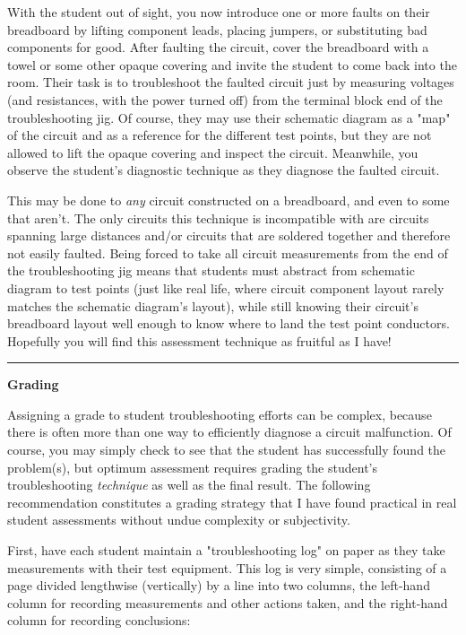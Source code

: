 With the student out of sight, you now introduce one or more faults on their breadboard by lifting component leads, placing jumpers, or substituting bad components for good.  After faulting the circuit, cover the breadboard with a towel or some other opaque covering and invite the student to come back into the room.  Their task is to troubleshoot the faulted circuit just by measuring voltages (and resistances, with the power turned off) from the terminal block end of the troubleshooting jig.  Of course, they may use their schematic diagram as a "map" of the circuit and as a reference for the different test points, but they are not allowed to lift the opaque covering and inspect the circuit.  Meanwhile, you observe the student's diagnostic technique as they diagnose the faulted circuit.

\vskip 10pt

This may be done to {\it any} circuit constructed on a breadboard, and even to some that aren't.  The only circuits this technique is incompatible with are circuits spanning large distances and/or circuits that are soldered together and therefore not easily faulted.  Being forced to take all circuit measurements from the end of the troubleshooting jig means that students must abstract from schematic diagram to test points (just like real life, where circuit component layout rarely matches the schematic diagram's layout), while still knowing their circuit's breadboard layout well enough to know where to land the test point conductors.  Hopefully you will find this assessment technique as fruitful as I have!

\vfil \eject 

\hrule

\vskip 10pt

\centerline{\bf Grading} \bigskip 

Assigning a grade to student troubleshooting efforts can be complex, because there is often more than one way to efficiently diagnose a circuit malfunction.  Of course, you may simply check to see that the student has successfully found the problem(s), but optimum assessment requires grading the student's troubleshooting {\it technique} as well as the final result.  The following recommendation constitutes a grading strategy that I have found practical in real student assessments without undue complexity or subjectivity.

First, have each student maintain a "troubleshooting log" on paper as they take measurements with their test equipment.  This log is very simple, consisting of a page divided lengthwise (vertically) by a line into two columns, the left-hand column for recording measurements and other actions taken, and the right-hand column for recording conclusions:

